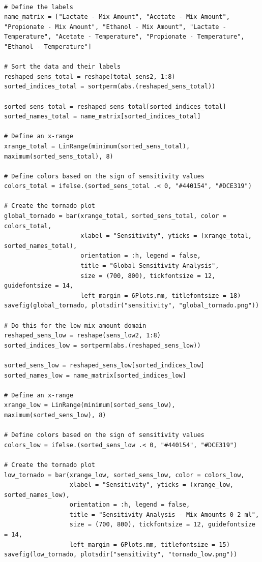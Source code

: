 \documentclass[11pt]{article}
\begin{document}
\begin{verbatim}

# Define the labels
name_matrix = ["Lactate - Mix Amount", "Acetate - Mix Amount", "Propionate - Mix Amount", "Ethanol - Mix Amount", "Lactate - Temperature", "Acetate - Temperature", "Propionate - Temperature", "Ethanol - Temperature"]

# Sort the data and their labels
reshaped_sens_total = reshape(total_sens2, 1:8)
sorted_indices_total = sortperm(abs.(reshaped_sens_total))

sorted_sens_total = reshaped_sens_total[sorted_indices_total]
sorted_names_total = name_matrix[sorted_indices_total]

# Define an x-range
xrange_total = LinRange(minimum(sorted_sens_total), maximum(sorted_sens_total), 8)

# Define colors based on the sign of sensitivity values
colors_total = ifelse.(sorted_sens_total .< 0, "#440154", "#DCE319")

# Create the tornado plot
global_tornado = bar(xrange_total, sorted_sens_total, color = colors_total,
                     xlabel = "Sensitivity", yticks = (xrange_total, sorted_names_total),
                     orientation = :h, legend = false,
                     title = "Global Sensitivity Analysis",
                     size = (700, 800), tickfontsize = 12, guidefontsize = 14,
                     left_margin = 6Plots.mm, titlefontsize = 18)
savefig(global_tornado, plotsdir("sensitivity", "global_tornado.png"))

# Do this for the low mix amount domain
reshaped_sens_low = reshape(sens_low2, 1:8)
sorted_indices_low = sortperm(abs.(reshaped_sens_low))

sorted_sens_low = reshaped_sens_low[sorted_indices_low]
sorted_names_low = name_matrix[sorted_indices_low]

# Define an x-range
xrange_low = LinRange(minimum(sorted_sens_low), maximum(sorted_sens_low), 8)

# Define colors based on the sign of sensitivity values
colors_low = ifelse.(sorted_sens_low .< 0, "#440154", "#DCE319")

# Create the tornado plot
low_tornado = bar(xrange_low, sorted_sens_low, color = colors_low,
                  xlabel = "Sensitivity", yticks = (xrange_low, sorted_names_low),
                  orientation = :h, legend = false,
                  title = "Sensitivity Analysis - Mix Amounts 0-2 ml",
                  size = (700, 800), tickfontsize = 12, guidefontsize = 14,
                  left_margin = 6Plots.mm, titlefontsize = 15)
savefig(low_tornado, plotsdir("sensitivity", "tornado_low.png"))


\end{verbatim}
\end{document}
